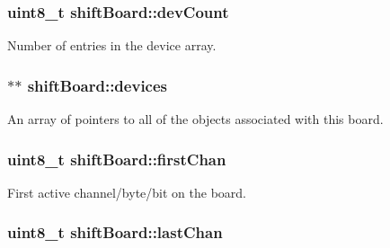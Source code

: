 \hypertarget{classshift_board_ae7bba07850ced1219dcf67cab33de929}{
\subsubsection[{devCount}]{\setlength{\rightskip}{0pt plus 5cm}uint8\_\-t {\bf shiftBoard::devCount}}}
\label{classshift_board_ae7bba07850ced1219dcf67cab33de929}


Number of entries in the device array. 

\hypertarget{classshift_board_a07a2549714f7064fa5e48ec63fdb5efb}{
\subsubsection[{devices}]{$\ast$$\ast$ {\bf shiftBoard::devices}}}
\label{classshift_board_a07a2549714f7064fa5e48ec63fdb5efb}


An array of pointers to all of the objects associated with this board. 

\hypertarget{classshift_board_abdbf7eaef6353a2ffddbf69753a82ef2}{
\subsubsection[{firstChan}]{\setlength{\rightskip}{0pt plus 5cm}uint8\_\-t {\bf shiftBoard::firstChan}}}
\label{classshift_board_abdbf7eaef6353a2ffddbf69753a82ef2}


First active channel/byte/bit on the board. 

\hypertarget{classshift_board_a61a3f53b408a4165d38b613efd2b4d5e}{
\subsubsection[{lastChan}]{\setlength{\rightskip}{0pt plus 5cm}uint8\_\-t {\bf shiftBoard::lastChan}}}
\label{classshift_board_a61a3f53b408a4165d38b613efd2b4d5e}


